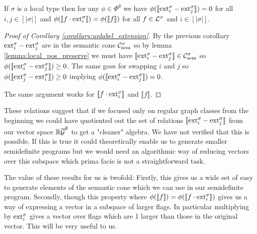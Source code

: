 \begin{corollary}
    \label{corollary:unlabel_extension}
    If $\sigma$ is a local type then for any $\phi\in\Phi^\emptyset$ we have
    $\phi(\llbracket \mathrm{ext}_i^\sigma - \mathrm{ext}_j^\sigma\rrbracket) = 0$
    for all $i,j\in [|\sigma|]$ and
    $\phi(\llbracket f \cdot \mathrm{ext}_i^\sigma\rrbracket) = \phi(\llbracket f \rrbracket)$
    for all $f\in\mathcal{L}^\sigma$ and $i\in [|\sigma|]$.
\end{corollary}

\begin{proof}[Proof of Corollary \ref{corollary:unlabel_extension}]
    By the previous corollary $\mathrm{ext}_i^\sigma - \mathrm{ext}_j^\sigma$ are in the
    semantic cone $\mathcal{C}_\mathrm{sem}^\sigma$ so by lemma \ref{lemma:local_pos_preserve}
    we must have $\llbracket \mathrm{ext}_i^\sigma - \mathrm{ext}_j^\sigma \rrbracket \in \mathcal{C}_\mathrm{sem}^\sigma$
    so $\phi(\llbracket \mathrm{ext}_i^\sigma - \mathrm{ext}_j^\sigma\rrbracket) \geq 0$.
    The same goes for swapping $i$ and $j$ so
    $\phi(\llbracket \mathrm{ext}_j^\sigma - \mathrm{ext}_i^\sigma\rrbracket) \geq 0$
    implying $\phi(\llbracket \mathrm{ext}_i^\sigma - \mathrm{ext}_j^\sigma\rrbracket) = 0$.

    The same argument works for $\llbracket f\cdot\mathrm{ext}_i^\sigma \rrbracket$ and
    $\llbracket f\rrbracket$.
\end{proof}

\begin{note}
    These relations suggest that if we focused only on regular graph classes
    from the beginning we could have quotiented out the set of relations
    $\llbracket \mathrm{ext}_i^\sigma - \mathrm{ext}_j^\sigma\rrbracket$ from our vector space $\mathbb{R}\overline{\mathcal{G}}^\emptyset$
    to get a "cleaner" algebra. We have not verified that this is possible. If this is true
    it could theoretically enable us to generate smaller semidefinite programs but we would
    need an algorithmic way of reducing vectors over this subspace which prima facie is not
    a straightforward task.
\end{note}

The value of these results for us is twofold: Firstly, this gives us a wide set of
easy to generate elements of the semantic cone which we can use in our semidefinite
program. Secondly, though this property where
$\phi(\llbracket f \rrbracket)=\phi(\llbracket f \cdot \mathrm{ext}_i^\sigma\rrbracket)$ gives
us a way of expressing a vector in a subspace of larger flags. In particular multiplying by
$\mathrm{ext}_i^\sigma$ gives a vector over flags which are 1 larger than those in the original
vector. This will be very useful to us.

